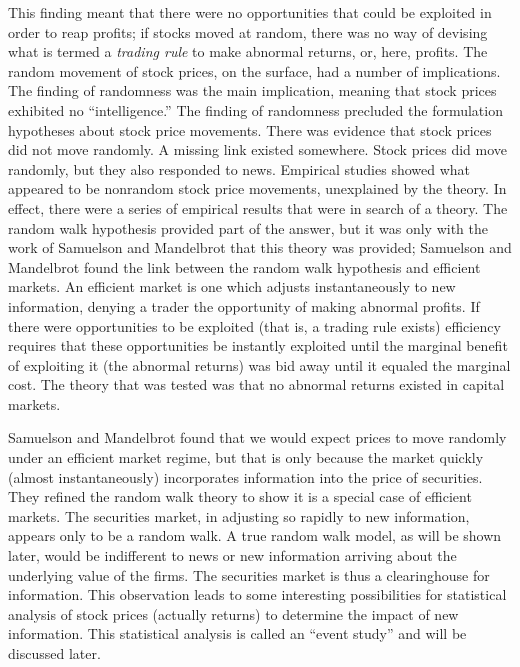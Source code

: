 This finding meant that there were no opportunities that could be exploited in order to reap profits; if stocks moved at random, there was no way of devising what is termed a {\em trading rule} to make abnormal returns, or, here, profits. The random movement of stock prices, on the surface, had a number of implications. The finding of randomness was the main implication, meaning that stock prices exhibited no ``intelligence.'' The finding of randomness precluded the formulation hypotheses about stock price movements. There was evidence that stock prices did not move randomly. A missing link existed somewhere. Stock prices did move randomly, but they also responded to news. Empirical studies showed what appeared to be nonrandom stock price movements, unexplained by the theory. In effect, there were a series of empirical results that were in search of a theory. The random walk hypothesis provided part of the answer, but it was only with the work of Samuelson \cite{samuelson} and Mandelbrot \cite{mandelbrot} that this theory was provided; Samuelson and Mandelbrot found the link between the random walk hypothesis and efficient markets. An efficient market is one which adjusts instantaneously to new information, denying a trader the opportunity of making abnormal profits. If there were opportunities to be exploited (that is, a trading rule exists) efficiency requires that these opportunities be instantly exploited until the marginal benefit of exploiting it (the abnormal returns) was bid away until it equaled the marginal cost. The theory that was tested was that no abnormal returns existed in capital markets.


Samuelson and Mandelbrot found that we would expect prices to move randomly under an efficient market regime, but that is only because the market quickly (almost instantaneously) incorporates information into the price of securities. They refined the random walk theory to show it is a special case of efficient markets. The securities market, in adjusting so rapidly to new information, appears only to be a random walk. A true random walk model, as will be shown later, would be indifferent to news or new information arriving about the underlying value of the firms. The securities market is thus a clearinghouse for information. This observation leads to some interesting possibilities for statistical analysis of stock prices (actually returns) to determine the impact of new information. This statistical analysis is called an ``event study'' and will be discussed later.


